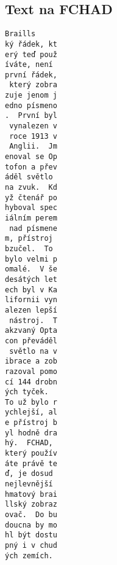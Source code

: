 \subsection{Text na FCHAD}
\begin{multicols}{3}
\begin{verbatim}
Braills
ký řádek, kt
erý teď použ
íváte, není 
první řádek,
 který zobra
zuje jenom j
edno písmeno
.  První byl
 vynalezen v
 roce 1913 v
 Anglii.  Jm
enoval se Op
tofon a přev
áděl světlo 
na zvuk.  Kd
yž čtenář po
hyboval spec
iálním perem
 nad písmene
m, přístroj 
bzučel.  To 
bylo velmi p
omalé.  V še
desátých let
ech byl v Ka
lifornii vyn
alezen lepší
 nástroj.  T
akzvaný Opta
con převáděl
 světlo na v
ibrace a zob
razoval pomo
cí 144 drobn
ých tyček.  
To už bylo r
ychlejší, al
e přístroj b
yl hodně dra
hý.  FCHAD, 
který použív
áte právě te
ď, je dosud 
nejlevnější 
hmatový brai
llský zobraz
ovač.  Do bu
doucna by mo
hl být dostu
pný i v chud
ých zemích.
\end{verbatim}
\end{multicols}

